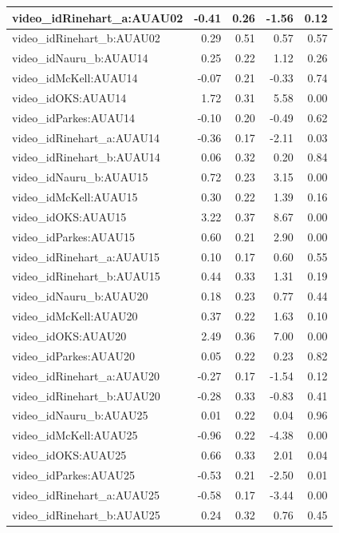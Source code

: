 \documentclass{monashthesis}
\begin{document}
\begin{tabular}{l|r|r|r|r}
\hline
video\_idRinehart\_a:AUAU02 & -0.41 & 0.26 & -1.56 & 0.12\\
\hline
video\_idRinehart\_b:AUAU02 & 0.29 & 0.51 & 0.57 & 0.57\\
\hline
video\_idNauru\_b:AUAU14 & 0.25 & 0.22 & 1.12 & 0.26\\
\hline
video\_idMcKell:AUAU14 & -0.07 & 0.21 & -0.33 & 0.74\\
\hline
video\_idOKS:AUAU14 & 1.72 & 0.31 & 5.58 & 0.00\\
\hline
video\_idParkes:AUAU14 & -0.10 & 0.20 & -0.49 & 0.62\\
\hline
video\_idRinehart\_a:AUAU14 & -0.36 & 0.17 & -2.11 & 0.03\\
\hline
video\_idRinehart\_b:AUAU14 & 0.06 & 0.32 & 0.20 & 0.84\\
\hline
video\_idNauru\_b:AUAU15 & 0.72 & 0.23 & 3.15 & 0.00\\
\hline
video\_idMcKell:AUAU15 & 0.30 & 0.22 & 1.39 & 0.16\\
\hline
video\_idOKS:AUAU15 & 3.22 & 0.37 & 8.67 & 0.00\\
\hline
video\_idParkes:AUAU15 & 0.60 & 0.21 & 2.90 & 0.00\\
\hline
video\_idRinehart\_a:AUAU15 & 0.10 & 0.17 & 0.60 & 0.55\\
\hline
video\_idRinehart\_b:AUAU15 & 0.44 & 0.33 & 1.31 & 0.19\\
\hline
video\_idNauru\_b:AUAU20 & 0.18 & 0.23 & 0.77 & 0.44\\
\hline
video\_idMcKell:AUAU20 & 0.37 & 0.22 & 1.63 & 0.10\\
\hline
video\_idOKS:AUAU20 & 2.49 & 0.36 & 7.00 & 0.00\\
\hline
video\_idParkes:AUAU20 & 0.05 & 0.22 & 0.23 & 0.82\\
\hline
video\_idRinehart\_a:AUAU20 & -0.27 & 0.17 & -1.54 & 0.12\\
\hline
video\_idRinehart\_b:AUAU20 & -0.28 & 0.33 & -0.83 & 0.41\\
\hline
video\_idNauru\_b:AUAU25 & 0.01 & 0.22 & 0.04 & 0.96\\
\hline
video\_idMcKell:AUAU25 & -0.96 & 0.22 & -4.38 & 0.00\\
\hline
video\_idOKS:AUAU25 & 0.66 & 0.33 & 2.01 & 0.04\\
\hline
video\_idParkes:AUAU25 & -0.53 & 0.21 & -2.50 & 0.01\\
\hline
video\_idRinehart\_a:AUAU25 & -0.58 & 0.17 & -3.44 & 0.00\\
\hline
video\_idRinehart\_b:AUAU25 & 0.24 & 0.32 & 0.76 & 0.45\\
\hline
\end{tabular}
\end{document}
